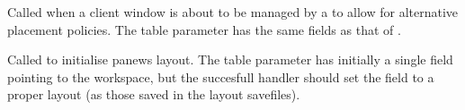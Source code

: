 \begin{function}
    \begin{funcdesc}
      Called when a client window is about to be managed by a 
      to allow for alternative placement policies. The table parameter
      has the same fields as that of .
    \end{funcdesc}
\end{function}


\begin{function}
    \begin{funcdesc}
      Called to initialise panews layout. The table parameter has
      initially a single field  pointing to the workspace,
      but the succesfull handler should set the field 
      to a proper layout (as those saved in the layout savefiles).
    \end{funcdesc}
\end{function}


